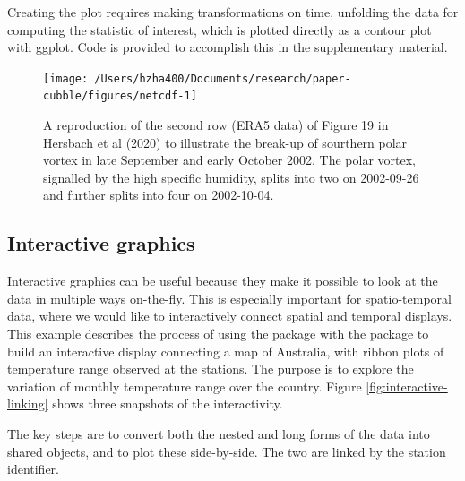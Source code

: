 \documentclass[
  shortnames]{jss}
\begin{document}
Creating the plot requires making transformations on time, unfolding the data for computing the statistic of interest, which is plotted directly as a contour plot with ggplot. Code is provided to accomplish this in the supplementary material.

\begin{CodeChunk}
\begin{figure}

{\centering \texttt{[image: /Users/hzha400/Documents/research/paper-cubble/figures/netcdf-1]} 

}

\caption[A reproduction of the second row (ERA5 data) of Figure 19 in Hersbach et al (2020) to illustrate the break-up of sourthern polar vortex in late September and early October 2002]{A reproduction of the second row (ERA5 data) of Figure 19 in Hersbach et al (2020) to illustrate the break-up of sourthern polar vortex in late September and early October 2002. The polar vortex, signalled by the high specific humidity, splits into two on 2002-09-26 and further splits into four on 2002-10-04.}\label{fig:netcdf}
\end{figure}
\end{CodeChunk}

\hypertarget{interactive-graphics-1}{%
\subsection{Interactive graphics}\label{interactive-graphics-1}}

Interactive graphics can be useful because they make it possible to look at the data in multiple ways on-the-fly. This is especially important for spatio-temporal data, where we would like to interactively connect spatial and temporal displays. This example describes the process of using the  package with the  package to build an interactive display connecting a map of Australia, with ribbon plots of temperature range observed at the stations. The purpose is to explore the variation of monthly temperature range over the country. Figure \ref{fig:interactive-linking} shows three snapshots of the interactivity.

The key steps are to convert both the nested and long forms of the data into shared  objects, and to plot these side-by-side. The two are linked by the station identifier.
\end{document}
